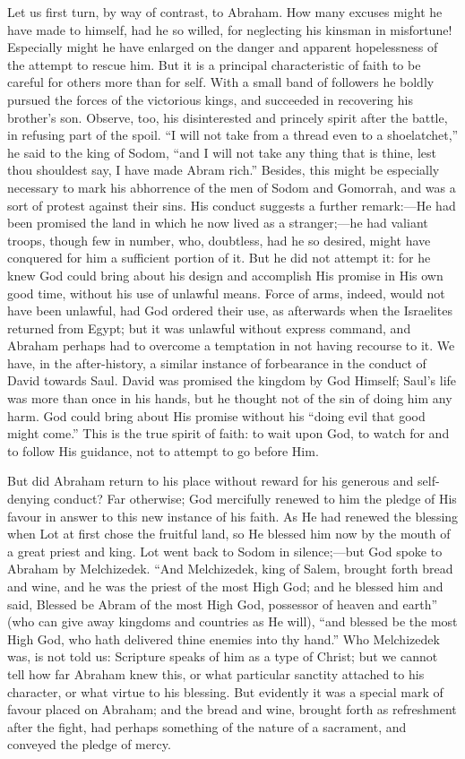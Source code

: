 Let us first turn, by way of contrast, to Abraham. How many excuses
might he have made to himself, had he so willed, for neglecting his
kinsman in misfortune! Especially might he have enlarged on the danger
and apparent hopelessness of the attempt to rescue him. But it is a
principal characteristic of faith to be careful for others more than
for self. With a small band of followers he boldly pursued the forces
of the victorious kings, and succeeded in recovering his brother's
son. Observe, too, his disinterested and princely spirit after the
battle, in refusing part of the spoil. ``I will not take from a
thread even to a shoelatchet,'' he said to the king of Sodom,
``and I will not take any thing that is thine, lest thou shouldest
say, I have made Abram rich.'' Besides, this might be especially
necessary to mark his abhorrence of the men of Sodom and Gomorrah, and
was a sort of protest against their sins. His conduct suggests a
further remark:—He had been promised the land in which he now lived
as a stranger;—he had valiant troops, though few in number, who,
doubtless, had he so desired, might have conquered for him a
sufficient portion of it. But he did not attempt it: for he knew God
could bring about his design and accomplish His promise in His own
good time, without his use of unlawful means. Force of arms, indeed,
would not have been unlawful, had God ordered their use, as afterwards
when the Israelites returned from Egypt; but it was unlawful without
express command, and Abraham perhaps had to overcome a temptation in
not having recourse to it. We have, in the after-history, a similar
instance of forbearance in the conduct of David towards Saul. David
was promised the kingdom by God Himself; Saul's life was more than
once in his hands, but he thought not of the sin of doing him any
harm. God could bring about His promise without his ``doing evil
that good might come.'' This is the true spirit of faith: to wait
upon God, to watch for and to follow His guidance, not to attempt to
go before Him.

But did Abraham return to his place without reward for his generous
and self-denying conduct? Far otherwise; God mercifully renewed to him
the pledge of His favour in answer to this new instance of his faith.
As He had renewed the blessing when Lot at first chose the fruitful
land, so He blessed him now by the mouth of a great priest and king.
Lot went back to Sodom in silence;—but God spoke to Abraham by
Melchizedek. ``And Melchizedek, king of Salem, brought forth bread
and wine, and he was the priest of the most High God; and he blessed
him and said, Blessed be Abram of the most High God, possessor of
heaven and earth'' (who can give away kingdoms and countries as He
will), ``and blessed be the most High God, who hath delivered
thine enemies into thy hand.'' Who Melchizedek was, is not told
us: Scripture speaks of him as a type of Christ; but we cannot tell
how far Abraham knew this, or what particular sanctity attached to his
character, or what virtue to his blessing. But evidently it was a
special mark of favour placed on Abraham; and the bread and wine,
brought forth as refreshment after the fight, had perhaps something of
the nature of a sacrament, and conveyed the pledge of mercy.

